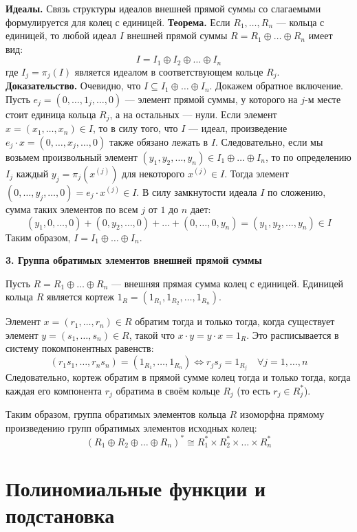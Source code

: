 \documentclass[12pt, a4paper]{article}
\theoremstyle{definition}
\theoremstyle{remark}
\begin{document}
\textbf{Идеалы.} Связь структуры идеалов внешней прямой суммы со слагаемыми формулируется для колец с единицей.
\textbf{Теорема.} Если $R_1, \dots, R_n$ — кольца с единицей, то любой идеал $I$ внешней прямой суммы $R = R_1 \oplus \dots \oplus R_n$ имеет вид:
$$ I = I_1 \oplus I_2 \oplus \dots \oplus I_n $$
где $I_j = \pi_j(I)$ является идеалом в соответствующем кольце $R_j$.
\textbf{Доказательство.} Очевидно, что $I \subseteq I_1 \oplus \dots \oplus I_n$. Докажем обратное включение. Пусть $e_j = (0, \dots, 1_j, \dots, 0)$ — элемент прямой суммы, у которого на $j$-м месте стоит единица кольца $R_j$, а на остальных — нули. 
Если элемент $x = (x_1, \dots, x_n) \in I$, то в силу того, что $I$ — идеал, произведение $e_j \cdot x = (0, \dots, x_j, \dots, 0)$ также обязано лежать в $I$. 
Следовательно, если мы возьмем произвольный элемент $(y_1, y_2, \dots, y_n) \in I_1 \oplus \dots \oplus I_n$, то по определению $I_j$ каждый $y_j = \pi_j(x^{(j)})$ для некоторого $x^{(j)} \in I$. Тогда элемент $(0, \dots, y_j, \dots, 0) = e_j \cdot x^{(j)} \in I$. В силу замкнутости идеала $I$ по сложению, сумма таких элементов по всем $j$ от $1$ до $n$ дает:
$$ (y_1, 0, \dots, 0) + (0, y_2, \dots, 0) + \dots + (0, \dots, 0, y_n) = (y_1, y_2, \dots, y_n) \in I $$
Таким образом, $I = I_1 \oplus \dots \oplus I_n$.

\textbf{3. Группа обратимых элементов внешней прямой суммы}

Пусть $R = R_1 \oplus \dots \oplus R_n$ — внешняя прямая сумма колец с единицей. Единицей кольца $R$ является кортеж $1_R = (1_{R_1}, 1_{R_2}, \dots, 1_{R_n})$.

Элемент $x = (r_1, \dots, r_n) \in R$ обратим тогда и только тогда, когда существует элемент $y = (s_1, \dots, s_n) \in R$, такой что $x \cdot y = y \cdot x = 1_R$. Это расписывается в систему покомпонентных равенств:
$$ (r_1 s_1, \dots, r_n s_n) = (1_{R_1}, \dots, 1_{R_n}) \iff r_j s_j = 1_{R_j} \quad \forall j = 1, \dots, n $$
Следовательно, кортеж обратим в прямой сумме колец тогда и только тогда, когда каждая его компонента $r_j$ обратима в своём кольце $R_j$ (то есть $r_j \in R_j^*$).

Таким образом, группа обратимых элементов кольца $R$ изоморфна прямому произведению групп обратимых элементов исходных колец:
$$ (R_1 \oplus R_2 \oplus \dots \oplus R_n)^* \cong R_1^* \times R_2^* \times \dots \times R_n^* $$
\section{Полиномиальные функции и подстановка}
\end{document}
